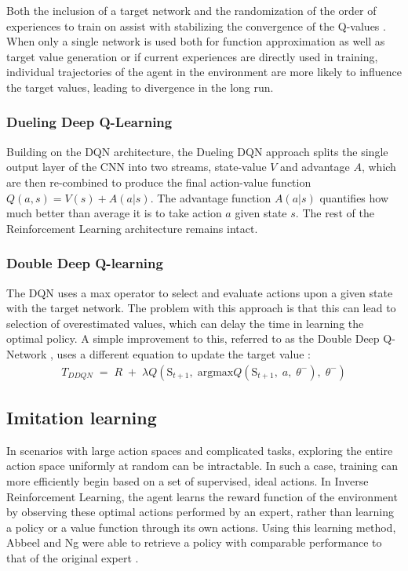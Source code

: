\documentclass[10pt,journal,compsoc]{IEEEtran}
\begin{document}
Both the inclusion of a target network and the randomization of the order of experiences to train on assist with stabilizing the convergence of the Q-values \cite{deepqlearning}. When only a single network is used both for function approximation as well as target value generation or if current experiences are directly used in training, individual trajectories of the agent in the environment are more likely to influence the target values, leading to divergence in the long run.

\subsubsection{Dueling Deep Q-Learning}
Building on the DQN architecture, the Dueling DQN approach \cite{wang2015dueling} splits the single output layer of the CNN into two streams, state-value $V$ and advantage $A$, which are then re-combined to produce the final action-value function $Q(a,s) = V(s) + A(a | s)$. The advantage function $A(a | s)$ quantifies how much better than average it is to take action $a$ given state $s$. The rest of the Reinforcement Learning architecture remains intact.

\subsubsection{Double Deep Q-learning}
The DQN uses a max operator to select and evaluate actions upon a given state with the target network. The problem with this approach is that this can lead to selection of overestimated values, which can delay the time in learning the optimal policy. A simple improvement to this, referred to as the Double Deep Q-Network \cite{doubledeepqlearning}, uses a different equation to update the target value :
\begin{equation}
\begin{aligned}
T_{DDQN}\; =\; R\; +\; \lambda Q\left( \mbox{S}_{t+1},\; \mbox{argmax}Q\left( \mbox{S}_{t+1},\; a,\; \theta ^{-} \right),\; \theta ^{-} \right)
\end{aligned}
\end{equation}
\subsection{Imitation learning}
In scenarios with large action spaces and complicated tasks, exploring the entire action space uniformly at random can be intractable. In such a case, training can more efficiently begin based on a set of supervised, ideal actions. In Inverse Reinforcement Learning, the agent learns the reward function of the environment by observing these optimal actions performed by an expert, rather than learning a policy or a value function through its own actions. Using this learning method, Abbeel and Ng were able to retrieve a policy with comparable performance to that of the original expert \cite{abbeel2004apprenticeship}.
\end{document}
